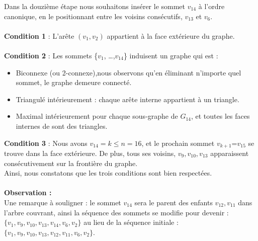\documentclass[hidelinks,letterpaper,12pt]{article}
\begin{document}
\begin{figure}[H]
\label{Graphe $G_{14}$}	
\end{figure}
Dans la douzième étape nous souhaitons insérer le sommet $v_{14}$ à l'ordre canonique, en le positionnant entre les voisins consécutifs, $v_{13}$ et $v_{6}$.
\\ \\
\textbf{Condition 1} : L'arête \( (v_1,v_2) \) appartient à la face extérieure du graphe.
\\ \\
\textbf{Condition 2} : Les sommets \{$v_1$, \ldots ,$v_{14}$\} induisent un graphe qui est :
\begin{itemize}
\item Biconnexe (ou 2-connexe),nous observons qu'en éliminant n'importe quel sommet, le graphe demeure connecté.
\item Triangulé intérieurement : chaque arête interne appartient à un triangle.
\item Maximal intérieurement pour chaque sous-graphe de $G_{14}$, et toutes les faces internes de sont des triangles.
\\
\end{itemize}
\textbf{Condition 3} : Nous avons $v_{14}=k \leq n=16$, et le prochain sommet $v_{k+1}$=$v_{15}$ se trouve dans la face extérieure. De plus, tous ses voisins, \(v_{9}, v_{10}, v_{13}\) apparaissent consécutivement sur la frontière du graphe.
\\
Ainsi, nous constatons que les trois conditions sont bien respectées.
\\ \\
\textbf{Observation :}
\\
Une remarque à souligner : le sommet \(v_{14}\) sera le parent des enfants \(v_{12}, v_{11}\) dans l'arbre couvrant, ainsi la séquence des sommets se modifie pour devenir : \(\{v_1, v_9, v_{10}, v_{13}, v_{14}, v_{6}, v_2\}\) au lieu de la séquence initiale : \(\{v_1, v_9, v_{10}, v_{13}, v_{12}, v_{11}, v_6, v_2\}\).
\end{document}
